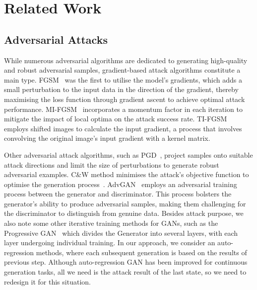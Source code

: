 \section{Related Work}
\subsection{Adversarial Attacks}
While numerous adversarial algorithms are dedicated to generating high-quality and robust adversarial samples, gradient-based attack algorithms constitute a main type. FGSM~\citep{goodfellow2014explaining} was the first to utilise the model's gradients, which adds a small perturbation to the input data in the direction of the gradient, thereby maximising the loss function through gradient ascent to achieve optimal attack performance. MI-FGSM~\citep{dong2018boosting} incorporates a momentum factor in each iteration to mitigate the impact of local optima on the attack success rate. TI-FGSM~\citep{dong2019evading} employs shifted images to calculate the input gradient, a process that involves convolving the original image's input gradient with a kernel matrix.

Other adversarial attack algorithms, such as PGD~\citep{madry2017towards}, project samples onto suitable attack directions and limit the size of perturbations to generate robust adversarial examples. C\&W method minimises the attack's objective function to optimise the generation process~\citep{carlini2017towards}. AdvGAN~\citep{xiao2018generating} employs an adversarial training process between the generator and discriminator. This process bolsters the generator's ability to produce adversarial samples, making them challenging for the discriminator to distinguish from genuine data. Besides attack purpose, we also note some other iterative training methods for GANs, such as the Progressive GAN~\citep{karras2017progressive} which divides the Generator into several layers, with each layer undergoing individual training. In our approach, we consider an auto-regression methods, where each subsequent generation is based on the results of previous step. Although auto-regression GAN has been improved for continuous generation tasks, all we need is the attack result of the last state, so we need to redesign it for this situation.

